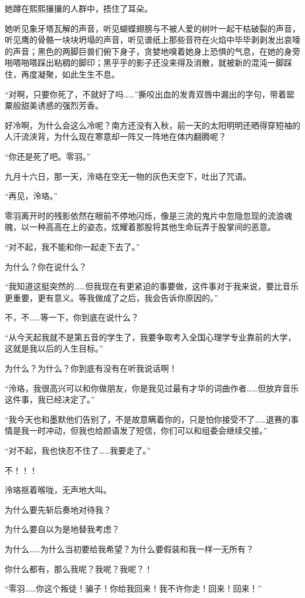 \documentclass[UTF8, scheme = chinese, openany]{ctexbook}
\begin{document}
她蹲在熙熙攘攘的人群中，捂住了耳朵。

她听见象牙塔瓦解的声音，听见蝴蝶翅膀与不被人爱的树叶一起干枯破裂的声音，听见鹰的骨骼一块块坍塌的声音，听见谱纸上那些音符在火焰中毕毕剥剥发出哀嚎的声音；黑色的两脚巨兽们俯下身子，贪婪地嗅着她身上恐惧的气息，在她的身旁啪嗒啪嗒踩出粘稠的脚印；黑乎乎的影子还没来得及消散，就被新的混沌一脚踩住，再度凝聚，如此生生不息。

“对啊，只要你死了，不就好了吗……”撕咬出血的发青双唇中漏出的字句，带着罂粟般甜美诱惑的强烈芳香。

好冷啊，为什么会这么冷呢？南方还没有入秋，前一天的太阳明明还晒得穿短袖的人汗流浃背，为什么现在寒意却一阵又一阵地在体内翻腾呢？

“你还是死了吧。零羽。”

九月十六日，那一天，泠珞在空无一物的灰色天空下，吐出了咒语。

“再见，泠珞。”

零羽离开时的残影依然在眼前不停地闪烁，像是三流的鬼片中忽隐忽现的流浪魂魄，以一种高高在上的姿态，炫耀着那股将其他生命玩弄于股掌间的恶意。

“对不起，我不能和你一起走下去了。”

为什么？你在说什么？

“我知道这挺突然的……但我现在有更紧迫的事要做，这件事对于我来说，要比音乐更重要，更有意义。等我做成了之后，我会告诉你原因的。”

不，不……等一下，你到底在说什么？

“从今天起我就不是第五音的学生了，我要争取考入全国心理学专业靠前的大学，这就是我以后的人生目标。”

为什么？为什么？你到底有没有在听我说话啊！

“泠珞，我很高兴可以和你做朋友，你是我见过最有才华的词曲作者……但放弃音乐这件事，我已经决定了。”

“我今天也和墨默他们告别了，不是故意瞒着你的，只是怕你接受不了……退赛的事情是我一时冲动，但我也给颜语发了短信，你们可以和组委会继续交接。”

“对不起，我也快忍不住了……我要走了。”

不！！！

泠珞抠着喉咙，无声地大叫。

为什么要先斩后奏地对待我？

为什么要自以为是地替我考虑？

为什么……为什么当初要给我希望？为什么要假装和我一样一无所有？

你什么都有，那么我呢？我呢？我呢？！

“零羽……你这个叛徒！骗子！你给我回来！我不许你走！回来！回来！”
\end{document}
